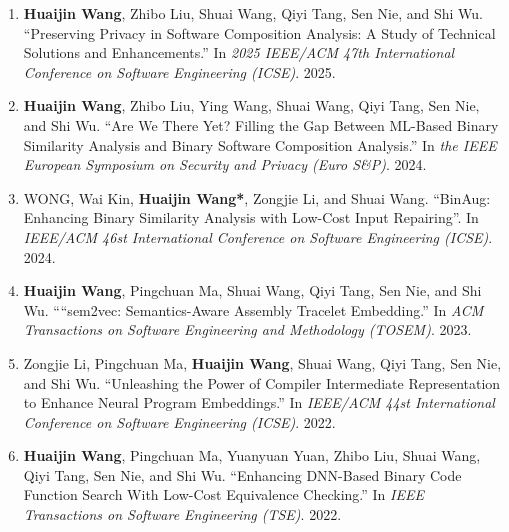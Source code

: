\begin{enumerate}
    \item \textbf{Huaijin Wang}, Zhibo Liu, Shuai Wang, Qiyi Tang, Sen Nie, and Shi Wu.
    ``Preserving Privacy in Software Composition Analysis: A Study of Technical Solutions and Enhancements.''
    In \textit{2025 IEEE/ACM 47th International Conference on Software Engineering (ICSE)}. 2025.

    \item \textbf{Huaijin Wang}, Zhibo Liu, Ying Wang, Shuai Wang, Qiyi Tang, Sen Nie, and Shi Wu.
    ``Are We There Yet? Filling the Gap Between ML-Based Binary Similarity Analysis and Binary Software Composition Analysis.''
    In \textit{the IEEE European Symposium on Security and Privacy (Euro S\&P)}. 2024.
    
    
    \item WONG, Wai Kin, \textbf{Huaijin Wang*}, Zongjie Li, and Shuai Wang.
    ``BinAug: Enhancing Binary Similarity Analysis with Low-Cost Input Repairing''.
    In \textit{IEEE/ACM 46st International Conference on Software Engineering (ICSE)}. 2024.
    
    
    \item \textbf{Huaijin Wang}, Pingchuan Ma, Shuai Wang, Qiyi Tang, Sen Nie, and Shi Wu.
    ``“sem2vec: Semantics-Aware Assembly Tracelet Embedding.''
    In \textit{ACM Transactions on Software Engineering and Methodology (TOSEM)}. 2023.
    
    \item Zongjie Li, Pingchuan Ma, \textbf{Huaijin Wang}, Shuai Wang, Qiyi Tang, Sen Nie, and Shi Wu.
    ``Unleashing the Power of Compiler
    Intermediate Representation to Enhance Neural Program Embeddings.''
    In \textit{IEEE/ACM 44st International Conference on Software Engineering (ICSE)}. 2022.
    
    \item \textbf{Huaijin Wang}, Pingchuan Ma, Yuanyuan Yuan, Zhibo Liu, Shuai Wang, Qiyi Tang, Sen Nie, and Shi Wu.
    ``Enhancing DNN-Based
    Binary Code Function Search With Low-Cost Equivalence Checking.''
    In \textit{IEEE Transactions on Software Engineering (TSE)}. 2022.
    

\end{enumerate}
